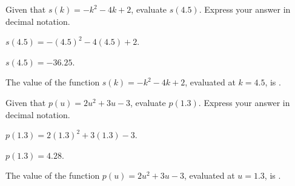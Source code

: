 \documentclass{ximera}
\begin{document}

\begin{shuffle}
\begin{exercise}
Given that $s(k)=-k^2-4 k+2$, evaluate $s(4.5)$. Express your answer in decimal notation.
\begin{solution}
\begin{hint}
$s(4.5)=-(4.5)^2-4 (4.5)+2$.
\end{hint}
\begin{hint}
$s(4.5)=-36.25$.
\end{hint}
The value of the function $s(k)=-k^2-4 k+2$, evaluated at $k=4.5$, is .
\end{solution}
\end{exercise}

\begin{exercise}
Given that $p(u)=2 u^2+3 u-3$, evaluate $p(1.3)$. Express your answer in decimal notation.
\begin{solution}
\begin{hint}
$p(1.3)=2 (1.3)^2+3 (1.3)-3$.
\end{hint}
\begin{hint}
$p(1.3)=4.28$.
\end{hint}
The value of the function $p(u)=2 u^2+3 u-3$, evaluated at $u=1.3$, is .
\end{solution}
\end{exercise}

\end{shuffle}
\end{document}
